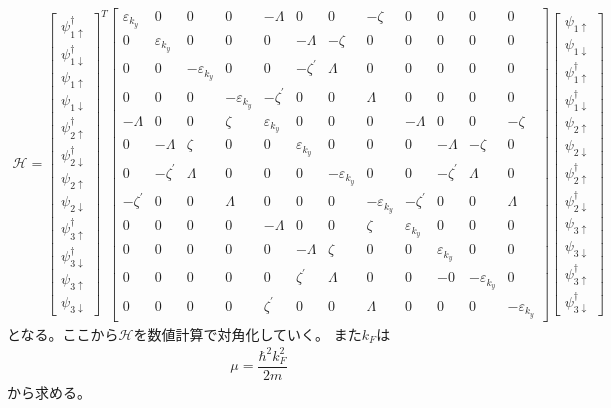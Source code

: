 \documentclass{jarticle}
\begin{document}
\begin{align}
\mathcal{H}=
\begin{bmatrix}
\psi_{1\uparrow}^\dagger \\ 
\psi_{1\downarrow}^\dagger \\ 
\psi_{1\uparrow} \\ 
\psi_{1\downarrow} \\ 
\psi_{2\uparrow}^\dagger \\ 
\psi_{2\downarrow}^\dagger \\ 
\psi_{2\uparrow} \\ 
\psi_{2\downarrow} \\ 
\psi_{3\uparrow}^\dagger \\ 
\psi_{3\downarrow}^\dagger \\ 
\psi_{3\uparrow} \\ 
\psi_{3\downarrow}
\end{bmatrix} 
^T
\begin{bmatrix}
\varepsilon_{k_y} & 0 & 0 & 0 & -\Lambda & 0 & 0 & -\zeta & 0 & 0 & 0 & 0 \\ 
0 & \varepsilon_{k_y} & 0 & 0 & 0 & -\Lambda & -\zeta & 0 & 0 & 0 & 0 & 0 \\ 
0 & 0 & -\varepsilon_{k_y} & 0 & 0 & -\zeta^{'} & \Lambda & 0 & 0 & 0 & 0 & 0 \\ 
0 & 0 & 0 & -\varepsilon_{k_y} & -\zeta^{'} & 0 & 0 & \Lambda & 0 & 0 & 0 & 0 \\ 
-\Lambda & 0 & 0 & \zeta & \varepsilon_{k_y} & 0 & 0 & 0 & -\Lambda & 0 & 0 & -\zeta \\ 
0 & -\Lambda & \zeta & 0 & 0 & \varepsilon_{k_y} & 0 & 0 & 0 & -\Lambda & -\zeta & 0 \\ 
0 & -\zeta^{'} & \Lambda & 0 & 0 & 0 & -\varepsilon_{k_y} & 0 & 0 & -\zeta^{'} & \Lambda & 0 \\ 
-\zeta^{'} & 0 & 0 & \Lambda & 0 & 0 & 0 & -\varepsilon_{k_y} & -\zeta^{'} & 0 & 0 & \Lambda \\ 
0 & 0 & 0 & 0 & -\Lambda & 0 & 0 & \zeta & \varepsilon_{k_y} & 0 & 0 & 0 \\ 
0 & 0 & 0 & 0 & 0 & -\Lambda & \zeta & 0 & 0 & \varepsilon_{k_y} & 0 & 0 \\ 
0 & 0 & 0 & 0 & 0 & \zeta^{'} & \Lambda & 0 & 0 & -0 & -\varepsilon_{k_y} & 0 \\ 
0 & 0 & 0 & 0 & \zeta^{'} & 0 & 0 & \Lambda & 0 & 0 & 0 & -\varepsilon_{k_y}
\end{bmatrix} 
\begin{bmatrix}
\psi_{1\uparrow} \\ 
\psi_{1\downarrow} \\ 
\psi_{1\uparrow}^\dagger \\ 
\psi_{1\downarrow}^\dagger \\ 
\psi_{2\uparrow} \\ 
\psi_{2\downarrow} \\ 
\psi_{2\uparrow}^\dagger \\ 
\psi_{2\downarrow}^\dagger \\ 
\psi_{3\uparrow} \\ 
\psi_{3\downarrow} \\ 
\psi_{3\uparrow}^\dagger \\ 
\psi_{3\downarrow}^\dagger
\end{bmatrix} 
\end{align}
となる。ここから$\mathcal{H}$を数値計算で対角化していく。
また$k_{F}$は
\begin{align}
\mu=\dfrac{\hbar^{2}k_F^{2}}{2m}
\end{align}
から求める。
\end{document}

